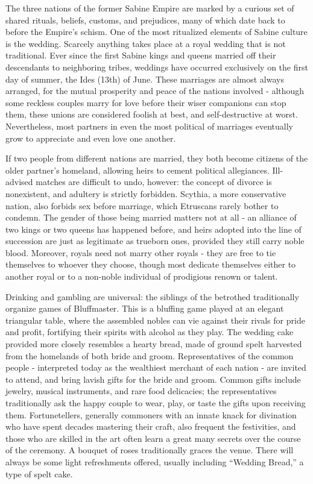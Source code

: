 \documentclass[blue]{Kos}
\begin{document}
\name{\bSabine{}}

The three nations of the former Sabine Empire are marked by a curious set of shared rituals, beliefs, customs, and prejudices, many of which date back to before the Empire's schism. One of the most ritualized elements of Sabine culture is the wedding. Scarcely anything takes place at a royal wedding that is not traditional. Ever since the first Sabine kings and queens married off their descendants to neighboring tribes, weddings have occurred exclusively on the first day of summer, the Ides (13th) of June. These marriages are almost always arranged, for the mutual prosperity and peace of the nations involved - although some reckless couples marry for love before their wiser companions can stop them, these unions are considered foolish at best, and self-destructive at worst. Nevertheless, most partners in even the most political of marriages eventually grow to appreciate and even love one another.

If two people from different nations are married, they both become citizens of the older partner's homeland, allowing heirs to cement political allegiances. Ill-advised matches are difficult to undo, however: the concept of divorce is nonexistent, and adultery is strictly forbidden. Scythia, a more conservative nation, also forbids sex before marriage, which Etruscans rarely bother to condemn. The gender of those being married matters not at all - an alliance of two kings or two queens has happened before, and heirs adopted into the line of succession are just as legitimate as trueborn ones, provided they still carry noble blood. Moreover, royals need not marry other royals - they are free to tie themselves to whoever they choose, though most dedicate themselves either to another royal or to a non-noble individual of prodigious renown or talent.

Drinking and gambling are universal: the siblings of the betrothed traditionally organize games of Bluffmaster. This is a bluffing game played at an elegant triangular table, where the assembled nobles can vie against their rivals for pride and profit, fortifying their spirits with alcohol as they play. The wedding cake provided more closely resembles a hearty bread, made of ground spelt harvested from the homelands of both bride and groom. Representatives of the common people - interpreted today as the wealthiest merchant of each nation - are invited to attend, and bring lavish gifts for the bride and groom. Common gifts include jewelry, musical instruments, and rare food delicacies; the representatives traditionally ask the happy couple to wear, play, or taste the gifts upon receiving them. Fortunetellers, generally commoners with an innate knack for divination who have spent decades mastering their craft, also frequent the festivities, and those who are skilled in the art often learn a great many secrets over the course of the ceremony. A bouquet of roses traditionally graces the venue. There will always be some light refreshments offered, usually including ``Wedding Bread,'' a type of spelt cake.
\end{document}

